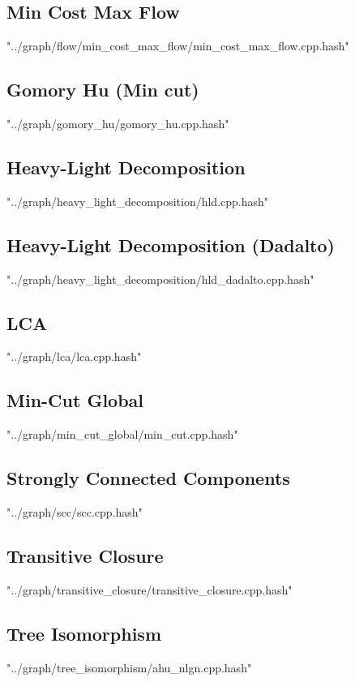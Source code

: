 \documentclass [12pt,onecolumn,oneside]{article}
\begin{document}
\subsection{ Min Cost Max Flow}
 {"../graph/flow/min_cost_max_flow/min_cost_max_flow.cpp.hash"}
\newpage

\subsection{ Gomory Hu (Min cut)}
 {"../graph/gomory_hu/gomory_hu.cpp.hash"}
\newpage

\subsection{ Heavy-Light Decomposition}
 {"../graph/heavy_light_decomposition/hld.cpp.hash"}
\newpage

\subsection{ Heavy-Light Decomposition (Dadalto)}
 {"../graph/heavy_light_decomposition/hld_dadalto.cpp.hash"}
\newpage

\subsection{ LCA}
 {"../graph/lca/lca.cpp.hash"}
\newpage

\subsection{ Min-Cut Global}
 {"../graph/min_cut_global/min_cut.cpp.hash"}
\newpage

\subsection{ Strongly Connected Components}
 {"../graph/scc/scc.cpp.hash"}
\newpage

\subsection{ Transitive Closure}
 {"../graph/transitive_closure/transitive_closure.cpp.hash"}
\newpage

\subsection{ Tree Isomorphism}
 {"../graph/tree_isomorphism/ahu_nlgn.cpp.hash"}
\newpage
\end{document}
